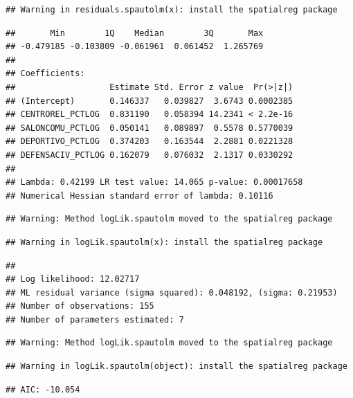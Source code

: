 \documentclass[11pt,]{article}
\newenvironment{Shaded}{\begin{snugshade}}{\end{snugshade}}
\newcommand{\KeywordTok}[1]{\textcolor[rgb]{0.13,0.29,0.53}{\textbf{#1}}}
\newcommand{\DataTypeTok}[1]{\textcolor[rgb]{0.13,0.29,0.53}{#1}}
\newcommand{\StringTok}[1]{\textcolor[rgb]{0.31,0.60,0.02}{#1}}
\newcommand{\OperatorTok}[1]{\textcolor[rgb]{0.81,0.36,0.00}{\textbf{#1}}}
\newcommand{\NormalTok}[1]{#1}
\begin{document}
\begin{verbatim}
## Warning in residuals.spautolm(x): install the spatialreg package
\end{verbatim}

\begin{verbatim}
##       Min        1Q    Median        3Q       Max 
## -0.479185 -0.103809 -0.061961  0.061452  1.265769 
## 
## Coefficients: 
##                   Estimate Std. Error z value  Pr(>|z|)
## (Intercept)       0.146337   0.039827  3.6743 0.0002385
## CENTROREL_PCTLOG  0.831190   0.058394 14.2341 < 2.2e-16
## SALONCOMU_PCTLOG  0.050141   0.089897  0.5578 0.5770039
## DEPORTIVO_PCTLOG  0.374203   0.163544  2.2881 0.0221328
## DEFENSACIV_PCTLOG 0.162079   0.076032  2.1317 0.0330292
## 
## Lambda: 0.42199 LR test value: 14.065 p-value: 0.00017658 
## Numerical Hessian standard error of lambda: 0.10116
\end{verbatim}

\begin{verbatim}
## Warning: Method logLik.spautolm moved to the spatialreg package
\end{verbatim}

\begin{verbatim}
## Warning in logLik.spautolm(x): install the spatialreg package
\end{verbatim}

\begin{verbatim}
## 
## Log likelihood: 12.02717 
## ML residual variance (sigma squared): 0.048192, (sigma: 0.21953)
## Number of observations: 155 
## Number of parameters estimated: 7
\end{verbatim}

\begin{verbatim}
## Warning: Method logLik.spautolm moved to the spatialreg package
\end{verbatim}

\begin{verbatim}
## Warning in logLik.spautolm(object): install the spatialreg package
\end{verbatim}

\begin{verbatim}
## AIC: -10.054
\end{verbatim}

\begin{Shaded}
\end{Shaded}
\end{document}
